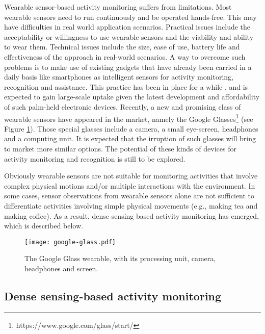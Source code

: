 Wearable sensor-based activity monitoring suffers from limitations. Most wearable sensors need to run continuously and be operated hands-free. This may have difficulties in real world application scenarios. Practical issues include the acceptability or willingness to use wearable sensors and the viability and ability to wear them. Technical issues include the size, ease of use, battery life and effectiveness of the approach in real-world scenarios. A way to overcome such problems is to make use of existing gadgets that have already been carried in a daily basis like smartphones as intelligent sensors for activity monitoring, recognition and assistance. This practice has been in place for a while \cite{Gellersen2002}, \cite{Schmidt2001} and is expected to gain large-scale uptake given the latest development and affordability of such palm-held electronic devices. Recently, a new and promising class of wearable sensors have appeared in the market, namely the Google Glasses\footnote{https://www.google.com/glass/start/} (see Figure \ref{fig-google-glass}). Those special glasses include a camera, a small eye-screen, headphones and a computing unit. It is expected that the irruption of such glasses will bring to market more similar options. The potential of these kinds of devices for activity monitoring and recognition is still to be explored. 

Obviously wearable sensors are not suitable for monitoring activities that involve complex physical motions and/or multiple interactions with the environment. In some cases, sensor observations from wearable sensors alone are not sufficient to differentiate activities involving simple physical movements (e.g., making tea and making coffee). As a result, dense sensing based activity monitoring has emerged, which is described below.

\begin{figure}[htbp]
\centering
\texttt{[image: google-glass.pdf]}
    \caption{The Google Glass wearable, with its processing unit, camera, headphones and screen.}
    \label{fig-google-glass}
\end{figure}

\subsection{Dense sensing-based activity monitoring}


